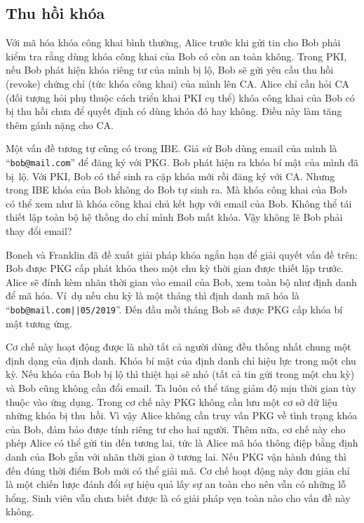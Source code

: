 \documentclass[class=report, crop=false]{standalone}
\begin{document}
		\subsection{Thu hồi khóa}\label{chap2:sec5:key_revocation}
			Với mã hóa khóa công khai bình thường, Alice trước khi gửi tin cho Bob phải kiểm tra rằng dùng khóa công khai của Bob có còn an toàn không. Trong PKI, nếu Bob phát hiện khóa riêng tư của mình bị lộ, Bob sẽ gửi yêu cầu thu hồi (revoke) chứng chỉ (tức khóa công khai) của mình lên CA. Alice chỉ cần hỏi CA (đối tượng hỏi phụ thuộc cách triển khai PKI cụ thể) khóa công khai của Bob có bị thu hồi chưa để quyết định có dùng khóa đó hay không. Điều này làm tăng thêm gánh nặng cho CA.

			Một vấn đề tương tự cũng có trong IBE. Giả sử Bob dùng email của mình là ``\texttt{bob@mail.com}'' để đăng ký với PKG. Bob phát hiện ra khóa bí mật của mình đã bị~lộ. Với PKI, Bob có thể sinh ra cặp khóa mới rồi đăng ký với CA. Nhưng trong IBE khóa của Bob không do Bob tự sinh ra. Mà khóa công khai của Bob có thể xem như là khóa công khai chủ kết hợp với email của Bob. Không thể tái thiết lập toàn bộ hệ thống do chỉ mình Bob mất khóa. Vậy không lẽ Bob phải thay đổi email?

			Boneh và Franklin \cite{DBLP:conf/crypto/BonehF01} đã đề xuất giải pháp khóa ngắn hạn để giải quyết vấn đề trên: Bob được PKG cấp phát khóa theo một chu kỳ thời gian được thiết lập trước. Alice sẽ đính kèm nhãn thời gian vào email của Bob, xem toàn bộ như định danh để mã hóa. Ví~dụ nếu chu kỳ là một tháng thì định danh mã hóa là ``\texttt{bob@mail.com||05/2019}''. Đến đầu mỗi tháng Bob sẽ được PKG cấp khóa bí mật tương ứng.
			
			Cơ chế này hoạt động được là nhờ tất cả người dùng đều thống nhất chung một định dạng của định danh. Khóa bí mật của định danh chỉ hiệu lực trong một chu kỳ. Nếu khóa của Bob bị lộ thì thiệt hại sẽ nhỏ (tất cả tin gửi trong một chu kỳ) và Bob cũng không cần đổi email. Ta luôn có thể tăng giảm độ mịn thời gian tùy thuộc vào ứng dụng. Trong cơ chế này PKG không cần lưu một cơ sở dữ liệu những khóa bị thu~hồi. Vì vậy Alice không cần truy vấn PKG về tình trạng khóa của Bob, đảm bảo được tính riêng tư cho hai người. Thêm nữa, cơ chế này cho phép Alice có thể gửi tin đến tương lai, tức là Alice mã hóa thông điệp bằng định danh của Bob gắn với nhãn thời gian ở tương lai. Nếu PKG vận hành đúng thì đến đúng thời điểm Bob mới có thể giải mã. Cơ chế hoạt động này đơn giản chỉ là một chiến lược đánh đổi sự hiệu quả lấy sự an toàn cho nên vẫn có những lỗ hổng. Sinh viên vẫn chưa biết được là có giải pháp vẹn toàn nào cho vấn đề này không.
\end{document}
